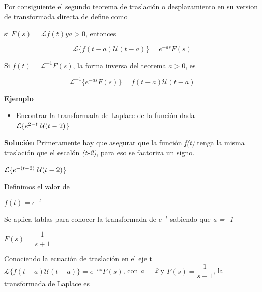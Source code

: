 \documentclass[12pt,a4paper]{article}
\begin{document}
\vspace{0.7cm}

Por consiguiente el segundo teorema de traslación o desplazamiento en su version de transformada directa de define como

si $F(s) = \mathcal{L}{f(t)} y a > 0$, entonces

\begin{equation}
\mathcal{L}\{f(t-a)\mathcal{U}(t-a)\} = e^{-as} F(s)
\end{equation}

\vspace{0.5cm}

Si $f(t) = \mathcal{L}^{-1}{F(s)}$, la forma inversa del teorema $a >0$, es

\begin{equation}
\mathcal{L}^{-1}\{e^{-as}F(s)\} = f(t-a)\mathcal{U}(t-a)
\end{equation}

\vspace{1cm}

\textbf{Ejemplo}

\begin{itemize}
\item Encontrar la transformada de Laplace de la función dada\\
$\mathcal{L} \{e^{2-t}\hspace{0.1cm} \mathcal{U}(t-2)$\}
\end{itemize}

\textbf{Solución}
Primeramente hay que asegurar que la función \textit{f(t)} tenga la misma traslación que el escalón \textit{(t-2)}, para eso se factoriza un signo.

\vspace{0.2cm}
\hspace{0.3cm}$\mathcal{L} \{e^{-(t-2)}\hspace{0.1cm} \mathcal{U}(t-2)$\}

\vspace{0.3cm}
Definimos el valor de

\hspace{0.3cm}$f(t) = e^{-t}$

Se aplica tablas para conocer la transformada de $ e^{-t} $ sabiendo que \textit{a = -1}

\hspace{0.3cm}$ F(s) = \dfrac{1}{s + 1} $

\vspace{0.2cm}
Conociendo la ecuación de traslación en el eje t $\mathcal{L}\{f(t-a)\mathcal{U}(t-a)\} = e^{-as} F(s)$, con \textit{a = 2} y $ F(s) = \dfrac{1}{s + 1} $, la transformada de Laplace es
\end{document}
